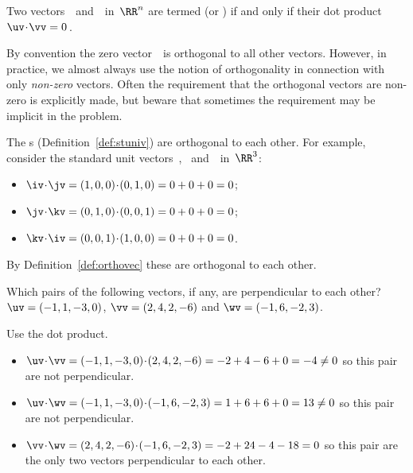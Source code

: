 \begin{definition} \label{def:orthovec}
Two vectors~\uv\ and~\vv\ in~\(\RR^n\) are termed
 (or )
if and only if their dot product \(\uv\cdot\vv=0\)\,.
\end{definition}

By convention the zero vector~\ov\ is orthogonal to all other vectors.
However, in practice, we almost always use the notion of orthogonality in connection with only \emph{non-zero} vectors.
Often the requirement that the orthogonal vectors are non-zero is explicitly made, but beware that sometimes the requirement may be implicit in the problem.


\begin{example} \label{eg:}
The s (Definition~\ref{def:stuniv}) are orthogonal to each other.
For example, consider the standard unit vectors~\iv, \jv\ and~\kv\ in~\(\RR^3\):
\begin{itemize}
\item \(\iv\cdot\jv=(1,0,0)\cdot(0,1,0)=0+0+0=0\);
\item \(\jv\cdot\kv=(0,1,0)\cdot(0,0,1)=0+0+0=0\);
\item \(\kv\cdot\iv=(0,0,1)\cdot(1,0,0)=0+0+0=0\).
\end{itemize}
By Definition~\ref{def:orthovec} these are orthogonal to each other.
\end{example}


\begin{example} \label{eg:}
Which pairs of the following vectors, if any, are perpendicular to each other?
\(\uv=(-1,1,-3,0)\), \(\vv=(2,4,2,-6)\) and \(\wv=(-1,6,-2,3)\).
\begin{solution} 
Use the dot product.
\begin{itemize}
\item \(\uv\cdot\vv =(-1,1,-3,0)\cdot(2,4,2,-6) =-2+4-6+0 =-4 \neq0\) so this pair are not perpendicular. 
\item \(\uv\cdot\wv =(-1,1,-3,0)\cdot(-1,6,-2,3) =1+6+6+0 =13 \neq0\) so this pair are not perpendicular. 
\item \(\vv\cdot\wv =(2,4,2,-6)\cdot(-1,6,-2,3) =-2+24-4-18 =0\) so this pair are the only two vectors perpendicular to each other. 
\end{itemize}
\end{solution}
\end{example}



